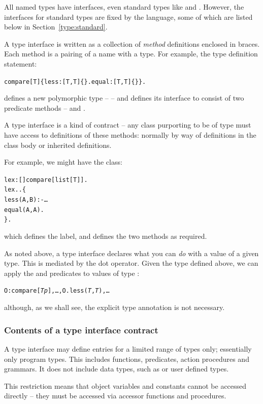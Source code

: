 All named types have interfaces, even standard types like  and . However, the interfaces for standard types are fixed by the language, some of which are listed below in Section~\vref{type:standard}. 

A type interface is written as a collection of \emph{method} definitions enclosed in braces. Each method is a pairing of a name with a type. For example, the type definition statement:
\begin{alltt}
compare[T] \impl \{ less:[T,T]\{\}. equal:[T,T]\{\} \}.
\end{alltt}
defines a new polymorphic type --  -- and defines its interface to consist of two predicate methods --  and .

A type interface is a kind of contract -- any class purporting to be of type  must have access to definitions of these methods: normally by way of definitions in the class body or inherited definitions.

For example, we might have the class:
\begin{alltt}
lex:[]\conarrow{}compare[list[T]].
lex..\{
  less(A,B) :- \ldots
  equal(A,A).
\}.
\end{alltt}
which defines the  label, and  defines the two methods as required.

As noted above, a type interface declares what you can \emph{do} with a value of a given type. This is mediated by the dot operator. Given the  type defined above, we can apply the  and  predicates to values of type :
\begin{alltt}
O:compare[\emph{Tp}], \ldots, O.less(\emph{T},\emph{T}), \ldots
\end{alltt}
although, as we shall see, the explicit type annotation is not necessary.

\subsubsection{Contents of a type interface contract}
A type interface may define entries for a limited range of types only; essentially only program types. This includes functions, predicates, action procedures and grammars. It does not include data types, such as  or user defined types.

This restriction means that object variables and constants cannot be accessed directly -- they must be accessed via accessor functions and procedures.


